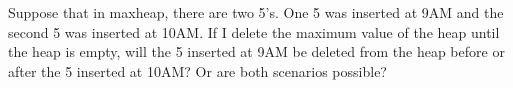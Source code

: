  Suppose that in maxheap, there are two 5's.
  One 5 was inserted at 9AM and the second 5 was inserted
  at 10AM.
  If I delete the maximum value of the heap
  until the heap is empty,
  will the 5 inserted at 9AM be deleted
  from the heap
  before or after the 5 inserted at 10AM?
  Or are both scenarios possible?
